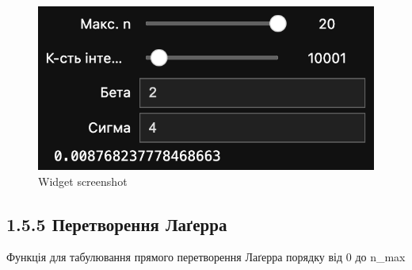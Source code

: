 \documentclass[11pt]{article}
\begin{document}
    \begin{figure}
\centering
\includegraphics{screenshots/3.png}
\caption{Widget screenshot}
\end{figure}
\newpage

    \subsection*{1.5.5 Перетворення
Лаґерра}\label{ux43fux435ux440ux435ux442ux432ux43eux440ux435ux43dux43dux44f-ux43bux430ux491ux435ux440ux440ux430}

Функція для табулювання прямого перетворення Лаґерра порядку від 0 до
n\_max
\end{document}
